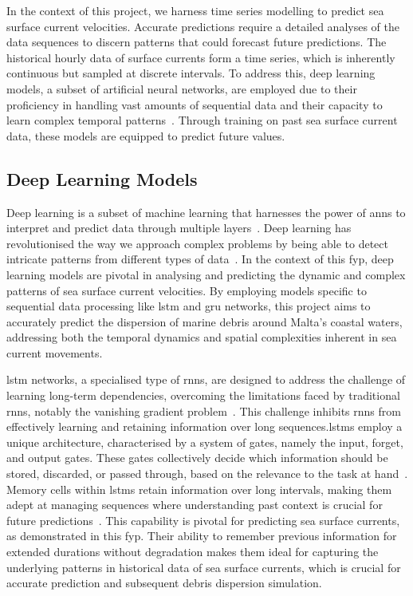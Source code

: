 In the context of this project, we harness time series modelling to predict sea surface current velocities. Accurate predictions require  a detailed analyses of the data sequences to discern patterns that could forecast future predictions. The historical hourly data of surface currents form a time series, which is inherently continuous but sampled at discrete intervals. To address this, deep learning models, a subset of artificial neural networks, are employed due to their proficiency in handling vast amounts of sequential data and their capacity to learn complex temporal patterns~\cite{29}. Through training on past sea surface current data, these models are equipped to predict future values.

\subsection{Deep Learning Models}
\label{subsec:2.1.5}
Deep learning is a subset of machine learning that harnesses the power of \acrshort{ann}s to interpret and predict data through multiple layers~\cite{30}. Deep learning has revolutionised the way we approach complex problems by being able to detect intricate patterns from different types of data~\cite{30}. In the context of this \acrshort{fyp}, deep learning models are pivotal in analysing and predicting the dynamic and complex patterns of sea surface current velocities. By employing models specific to sequential data processing like \acrshort{lstm} and \acrshort{gru} networks, this project aims to accurately predict the dispersion of marine debris around Malta's coastal waters, addressing both the temporal dynamics and spatial complexities inherent in sea current movements.

\acrshort{lstm} networks, a specialised type of \acrshort{rnn}s, are designed to address the challenge of learning long-term dependencies, overcoming the limitations faced by traditional \acrshort{rnn}s, notably the vanishing gradient problem~\cite{31}. This challenge inhibits \acrshort{rnn}s from effectively learning and retaining information over long sequences.\acrshort{lstm}s employ a unique architecture, characterised by a system of gates, namely the input, forget, and output gates. These gates collectively decide which information should be stored, discarded, or passed through, based on the relevance to the task at hand~\cite{32}. Memory cells within \acrshort{lstm}s retain information over long intervals, making them adept at managing sequences where understanding past context is crucial for future predictions~\cite{32}. This capability is pivotal for predicting sea surface currents, as demonstrated in this \acrshort{fyp}. Their ability to remember previous information for extended durations without degradation makes them ideal for capturing the underlying patterns in historical data of sea surface currents, which is crucial for accurate prediction and subsequent debris dispersion simulation.

